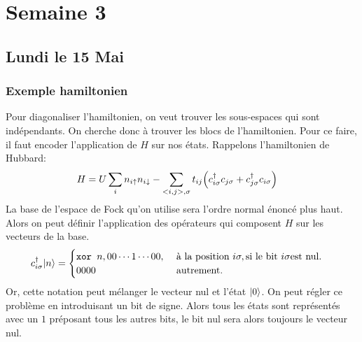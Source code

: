 \documentclass{subfiles}[../main.tex]
\begin{document}
    \section{Semaine 3} %
    \label{sec:Semaine 3}
        \subsection{Lundi le 15 Mai} %
        \label{sub:Lundi le 15 Mai}

            \subsubsection{Exemple hamiltonien}
            \label{sec:Exemple hamiltonien}
                Pour diagonaliser l'hamiltonien, on veut trouver les sous-espaces
                qui sont indépendants. On cherche donc à trouver les blocs de
                l'hamiltonien. Pour ce faire, il faut encoder l'application de
                $H$ sur nos états. Rappelons l'hamiltonien de Hubbard:
                \begin{align}
                    H&=U\sum_in_{i\uparrow}n_{i\downarrow}-
                    \sum_{<i,j>,\sigma}t_{ij}\qty(c^\dagger_{i\sigma}
                    c_{j\sigma}+c^\dagger_{j\sigma}
                    c_{i\sigma})
                \end{align}
                La base de l'espace de Fock qu'on utilise sera l'ordre normal
                énoncé plus haut. Alors on peut définir l'application des
                opérateurs qui composent $H$ sur les vecteurs de la base.
                \begin{align}
                    c^\dagger_{i\sigma}\ket{n}&=
                    \begin{cases}
                        \texttt{xor } n, 00\cdots1\cdots00, &\text{ à la position }
                        i\sigma, \text{si le bit } i\sigma \text{est nul.}\\
                        0000 & \text{autrement.}
                    \end{cases}
                \end{align}
                Or, cette notation peut mélanger le vecteur nul et l'état
                $|{0}\rangle$. On peut régler ce problème en introduisant un bit de
                signe. Alors tous les états sont représentés avec un $1$ préposant
                tous les autres bits, le bit nul sera alors toujours le vecteur
                nul.\\
\end{document}
